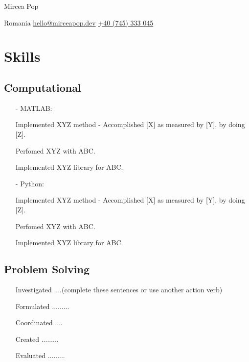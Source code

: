 \documentclass[11pt]{article}
\begin{document}
    
    \begin{center}      
        {\fontsize{28}{28}\selectfont Mircea Pop} \\ \bigskip
    
        {\color{icnclr}\faMapMarker} Romania \quad 
        {\color{icnclr}\faEnvelope[regular]} \href{mailto:hello@mirceapop.dev}{hello@mirceapop.dev} \quad
        {\color{icnclr}} \href{tel:+40745333045}{+40 (745) 333 045} 
    \end{center}

    \section{Skills}
    \subsection{Computational}
    \begin{itemize}
        \item[-] \textcolor{Sepia}{MATLAB}:
        \item[\checkmark] Implemented XYZ method - Accomplished [X] as measured by [Y], by doing [Z].  
        \item[\checkmark] Perfomed XYZ with ABC. 
        \item[\checkmark] Implemented XYZ library for ABC. 
        \item[-] \textcolor{Sepia}{Python}: 
        \item[\checkmark] Implemented XYZ method - Accomplished [X] as measured by [Y], by doing [Z].  
        \item[\checkmark] Perfomed XYZ with ABC. 
        \item[\checkmark] Implemented XYZ library for ABC.
    \end{itemize}
    \subsection{Problem Solving}
    \begin{itemize}
        \item[\checkmark] Investigated ....(complete these sentences or use another action verb)
        \item[\checkmark] Formulated .........
        \item[\checkmark] Coordinated ....
        \item[\checkmark] Created .........
        \item[\checkmark] Evaluated .........
    \end{itemize}
\end{document}
